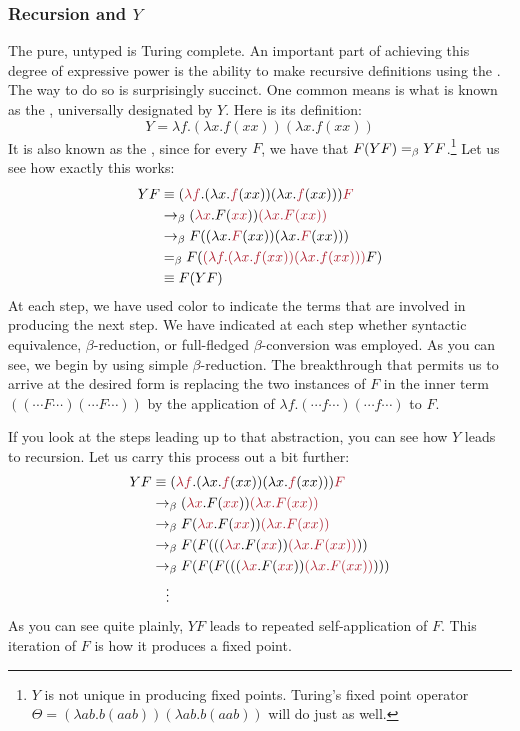 \subsubsection{Recursion and $Y$}\label{untyped:y}
The pure, untyped \lambdacalc is Turing complete. An important part of achieving this degree of expressive power is the ability to make recursive definitions using the \lambdacalc{}. The way to do so is surprisingly succinct. One common means is what is known as the , universally designated by $Y$. Here is its definition:
\[
Y = \lambda f. (\lambda x.f(xx))(\lambda x.f(xx))
\]
It is also known as the , since for every $F$, we have that $F(YF) =_{\beta} YF$.\footnote{$Y$ is not unique in producing fixed points. Turing's fixed point operator $\Theta = (\lambda a b . b (aab)) (\lambda a b . b (aab))$ will do just as well.} Let us see how exactly this works:
\begin{align*}
Y F &\equiv (\redex{\lambda f}. (\lambda x.\redex{f}(xx))(\lambda x.\redex{f}(xx))) \redex{F} \\
&\betared (\redex{\lambda x}. F(\redex{x}\redex{x})) \redex{(\lambda x. F(xx))}\\
&\betared F ( (\lambda x. \redex{F}(xx)) (\lambda x. \redex{F}(xx)) )\\
&\betacon F (\redex{(\lambda f. (\lambda x.f(xx))(\lambda x.f(xx)))} F)\\
&\equiv F (Y F)
\end{align*}
At each step, we have used color to indicate the terms that are involved in producing the next step. We have indicated at each step whether syntactic equivalence, $\beta$-re\-duc\-tion, or full-fledged $\beta$-con\-ver\-sion was employed. As you can see, we begin by using simple $\beta$-re\-duc\-tion. The breakthrough that permits us to arrive at the desired form is replacing the two instances of $F$ in the inner term $((\dotsb F \dotsb)(\dotsb F \dotsb))$ by the application of $\lambda f. (\dotsb f \dotsb)(\dotsb f \dotsb)$ to $F$.

If you look at the steps leading up to that abstraction, you can see how $Y$ leads to recursion. Let us carry this process out a bit further:
\begin{align*}
Y F &\equiv (\redex{\lambda f}. (\lambda x.\redex{f}(xx))(\lambda x.\redex{f}(xx))) \redex{F} \\
&\betared (\redex{\lambda x}. F(\redex{x}\redex{x})) \redex{(\lambda x. F(xx))}\\
&\betared F (\redex{\lambda x}. F(\redex{x}\redex{x})) \redex{(\lambda x. F(xx))}\\
&\betared F ( F ( ((\redex{\lambda x}. F(\redex{x}\redex{x})) \redex{(\lambda x. F(xx))} ))\\
&\betared F ( F ( F ( ((\redex{\lambda x}. F(\redex{x}\redex{x})) \redex{(\lambda x. F(xx))} )))\\
&\hphantom{\rightarrow}\vdots
\end{align*}
As you can see quite plainly, $YF$ leads to repeated self-ap\-pli\-ca\-tion of $F$. This iteration of $F$ is how it produces a fixed point.%

